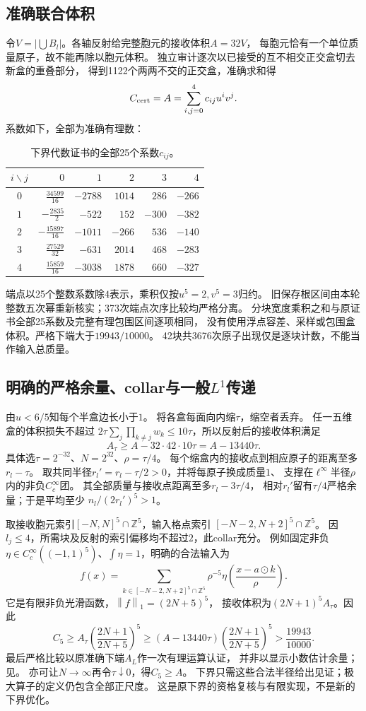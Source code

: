 \documentclass[UTF8,fontset=fandol,zihao=-4,a4paper]{ctexart}
\newcommand{\1}{\mathbf 1}
\newcommand{\norm}[1]{\left\lVert#1\right\rVert}
\begin{document}
\subsection{准确联合体积}
令$V=|\bigcup B_l|$。各轴反射给完整胞元的接收体积$A=32V$，
每胞元恰有一个单位质量原子，故不能再除以胞元体积。
独立审计逐次以已接受的互不相交正交盒切去新盒的重叠部分，
得到1122个两两不交的正交盒，准确求和得
\[
 C_{\rm cert}=A=\sum_{i,j=0}^4c_{ij}u^iv^j.
\]
系数如下，全部为准确有理数：
\begin{table}[ht]\centering\small
\begin{tabular}{c|rrrrr}
\toprule $i\backslash j$&$0$&$1$&$2$&$3$&$4$\\\midrule
$0$&$\frac{34599}{16}$&$-2788$&$1014$&$286$&$-266$\\
$1$&$-\frac{2835}{2}$&$-522$&$152$&$-300$&$-382$\\
$2$&$-\frac{15897}{16}$&$-1011$&$-266$&$536$&$-140$\\
$3$&$\frac{27529}{32}$&$-631$&$2014$&$468$&$-283$\\
$4$&$\frac{15859}{16}$&$-3038$&$1878$&$660$&$-327$\\
\bottomrule\end{tabular}
\caption{下界代数证书的全部25个系数$c_{ij}$。}\label{tab:lowercoeff}
\end{table}
端点以25个整数系数除$4$表示，乘积仅按$u^5=2,v^5=3$归约。
旧保存根区间由本轮整数五次幂重新核实；373次端点次序比较均严格分离。
分块宽度乘积之和与原证书全部25系数及完整有理包围区间逐项相同，
没有使用浮点容差、采样或包围盒体积。严格下端大于$19943/10000$。
42块共3676次原子出现仅是逐块计数，不能当作输入总质量。

\subsection{明确的严格余量、collar与一般$L^1$传递}
由$u<6/5$知每个半盒边长小于$1$。
将各盒每面向内缩$\tau$，缩空者丢弃。
任一五维盒的体积损失不超过
$2\tau\sum_j\prod_{k\ne j}w_k\le10\tau$，所以反射后的接收体积满足
\[
 A_\tau\ge A-32\cdot42\cdot10\tau=A-13440\tau.
\]
具体选$\tau=2^{-32}$、$N=2^{32}$、$\rho=\tau/4$。
每个缩盒内的接收点到相应原子的距离至多$r_l-\tau$。
取共同半径$r_l'=r_l-\tau/2>0$，并将每原子换成质量$1$、
支撑在$\ell^\infty$半径$\rho$内的非负$C_c^\infty$团。
其全部质量与接收点距离至多$r_l-3\tau/4$，
相对$r_l'$留有$\tau/4$严格余量；于是平均至少
$n_l/(2r_l')^5>1$。

取接收胞元索引$[-N,N]^5\cap\mathbb Z^5$，输入格点索引
$[-N-2,N+2]^5\cap\mathbb Z^5$。
因$l_j\le4$，所需块及反射的索引偏移均不超过$2$，此collar充分。
例如固定非负$\eta\in C_c^\infty((-1,1)^5)$、$\int\eta=1$，明确的合法输入为
\[
 f(x)=\sum_{k\in[-N-2,N+2]^5\cap\mathbb Z^5}
       \rho^{-5}\eta\!\left(\frac{x-a\odot k}{\rho}\right).
\]
它是有限非负光滑函数，$\norm f_1=(2N+5)^5$，
接收体积为$(2N+1)^5A_\tau$。因此
\[
 C_5\ge A_\tau\left(\frac{2N+1}{2N+5}\right)^5
 \ge(A-13440\tau)\left(\frac{2N+1}{2N+5}\right)^5
 >\frac{19943}{10000}.
\]
最后严格比较以原准确下端$A_L$作一次有理运算认证，
并非以显示小数估计余量；见。
亦可让$N\to\infty$再令$\tau\downarrow0$，得$C_5\ge A$。
下界只需这些合法半径给出见证；极大算子的定义仍包含全部正尺度。
这是原下界的资格复核与有限实现，不是新的下界优化。
\end{document}
